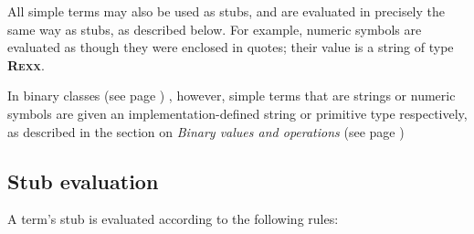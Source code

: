 All simple terms may also be used as stubs, and are evaluated in
precisely the same way as stubs, as described below.  For example,
numeric symbols are evaluated as though they were enclosed in quotes;
their value is a string of type \textbf{R\textsc{exx}}.
 
In  binary classes (see page \pageref{refbincla}) , however, simple terms that are
strings or numeric symbols are given an implementation-defined string or
primitive type respectively, as described in the section on
 \emph{Binary values and operations} (see page \pageref{refbinary}) 
\subsection{Stub evaluation}
 
A term's stub is evaluated according to the following rules:
